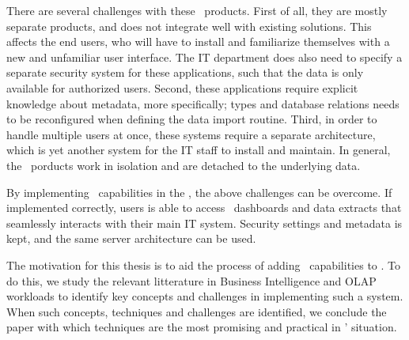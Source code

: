There are several challenges with these \bd~products. First of all, they are mostly separate products, and does not integrate well with existing solutions. This affects the end users, who will have to install and familiarize themselves with a new and unfamiliar user interface. The IT department does also need to specify a separate security system for these applications, such that the data is only available for authorized users. Second, these applications require explicit knowledge about metadata, more specifically; types and database relations needs to be reconfigured when defining the data import routine. Third, in order to handle multiple users at once, these systems require a separate architecture, which is yet another system for the IT staff to install and maintain. In general, the \bd~porducts work in isolation and are detached to the underlying data.

By implementing \bd~capabilities in the \genusSoftware, the above challenges can be overcome. If implemented correctly, users is able to access \bd~dashboards and data extracts that seamlessly interacts with their main IT system. Security settings and metadata is kept, and the same server architecture can be used.

The motivation for this thesis is to aid the process of adding \bd~capabilities to \genusSoftware. To do this, we study the relevant litterature in Business Intelligence and OLAP workloads to identify key concepts and challenges in implementing such a system. When such concepts, techniques and challenges are identified, we conclude the paper with which techniques are the most promising and practical in \genus' situation.
